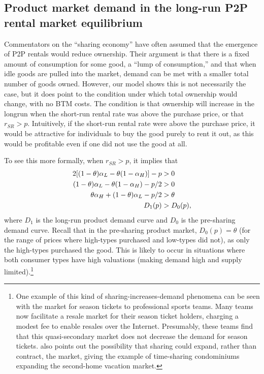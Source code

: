 \documentclass[11pt]{article}
\begin{document}
\subsection{Product market demand in the long-run P2P rental market equilibrium} 

Commentators on the ``sharing economy'' have often assumed that the emergence of P2P rentals would reduce ownership. 
Their argument is that there is a fixed amount of consumption for some good, a ``lump of consumption,'' and that when idle goods are pulled into the market, demand can be met with a smaller total number of goods owned.
However, our model shows this is not necessarily the case, but it does point to the condition under which total ownership would change, with no BTM costs.
The condition is that ownership will increase in the longrun when the short-run rental rate was above the purchase price, or that $r_{SR} > p$. 
Intuitively, if the short-run rental rate were above the purchase price, it would be attractive for individuals to buy the good purely to rent it out, as this would be profitable even if one did not use the good at all.

To see this more formally, when $r_{SR} > p$, it implies that
\begin{align}
 2[(1- \theta) \alpha_L - \theta(1 - \alpha_H)] - p &> 0 \notag \\
(1- \theta) \alpha_L - \theta(1 - \alpha_H) - p/2 &> 0 \notag \\
\theta \alpha_H + (1- \theta) \alpha_L - p/2 &> \theta \notag \\
 D_{1}(p) & > D_{0}(p), \notag \\
\end{align}
where $D_{1}$ is the long-run product demand curve and $D_{0}$ is the pre-sharing demand curve.
Recall that in the pre-sharing product market, $D_0(p) = \theta$ (for the range of prices where high-types purchased and low-types did not), as only the high-types purchased the good. 
This is likely to occur in situations where both consumer types have high valuations (making demand high and supply limited).\footnote{ 
  One example of this kind of sharing-increases-demand phenomena can be seen with the market for season tickets to professional sports teams.
  Many teams now facilitate a resale market for their season ticket holders, charging a modest fee to enable resales over the Internet.
  Presumably, these teams find that this quasi-secondary market does not decrease the demand for season tickets.
  \cite{belk2014you} also points out the possibility that sharing could expand, rather than contract, the market, giving the example of time-sharing condominiums expanding the second-home vacation market. 
}
\end{document}
